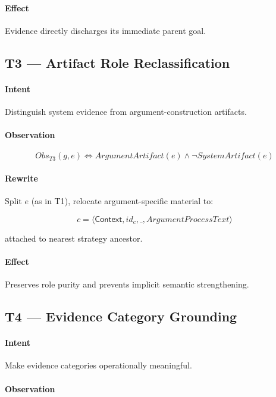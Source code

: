 \documentclass[12pt,twoside,a4paper]{article}
\begin{document}
\paragraph{Effect}
Evidence directly discharges its immediate parent goal.

\subsection{T3 --- Artifact Role Reclassification}

\paragraph{Intent}
Distinguish system evidence from argument-construction artifacts.

\paragraph{Observation}

\[
Obs_{T3}(g,e) \iff ArgumentArtifact(e) \wedge \neg SystemArtifact(e)
\]

\paragraph{Rewrite}

Split $e$ (as in T1), relocate argument-specific material to:

\[
c = \langle \mathsf{Context}, id_c, \_, ArgumentProcessText \rangle
\]

attached to nearest strategy ancestor.

\paragraph{Effect}
Preserves role purity and prevents implicit semantic strengthening.

\subsection{T4 --- Evidence Category Grounding}

\paragraph{Intent}
Make evidence categories operationally meaningful.

\paragraph{Observation}
\end{document}

